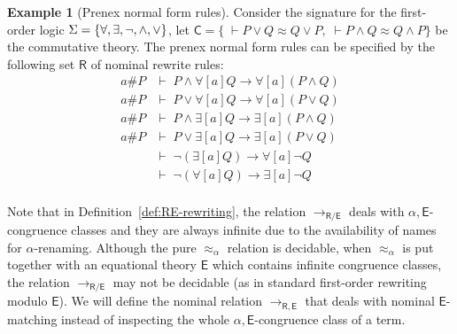 \documentclass[submission,copyright,creativecommons]{eptcs}
\newcommand{\aleq}{\approx_{\alpha}}
\newcommand{\theory}[1]{\ensuremath{\mathsf{#1}}}
\theoremstyle{plain}
\theoremstyle{definition}
\newtheorem{example}{Example}[section]
\theoremstyle{remark}
\newtheorem{remark}[theorem]{Remark}
\begin{document}
\begin{example}[Prenex normal form rules]\label{ex:prenex-rules}
    Consider the signature for the first-order logic $\Sigma = \{\forall, \exists, \lnot, \land,\linebreak
    \lor \}$, let $\theory{C} = \{\;\vdash P \lor Q \approx Q \lor P, \;\vdash P \land Q \approx Q \land P\}$ be the commutative theory. The prenex normal form rules can be specified by the following set $\theory{R}$ of nominal rewrite rules:
\[
\begin{array}{rl}
    a \# P & \vdash \; P \land \forall[a]Q \rightarrow \forall [a](P \land Q)\\
    a \# P & \vdash \; P \lor \forall[a] Q \rightarrow \forall[a] (P \lor Q)\\
    a \# P & \vdash \; P \land \exists[a]Q \rightarrow \exists[a](P \land Q)\\
    a \# P & \vdash \; P \lor \exists[a]Q \rightarrow \exists[a](P \lor Q)\\
    & \vdash \; \lnot (\exists[a]Q) \rightarrow \forall[a] \lnot Q\\
    & \vdash \; \lnot (\forall[a]Q) \rightarrow \exists[a] \lnot Q\\
\end{array}
\]

\end{example}

Note that in Definition~\ref{def:RE-rewriting}, the relation $\to_\theory{R/E}$ deals with $\alpha,\theory{E}$-congruence classes and they are always infinite due to the availability of names for $\alpha$-renaming. Although  the pure $\approx_\alpha$ relation is decidable,
when $\aleq$ is put together with an equational theory $\theory{E}$ which contains infinite congruence classes, the relation $\to_{\theory{R/E}}$ may not be decidable (as in standard first-order rewriting modulo $\theory{E}$).  We will define the nominal relation  $\to_{\theory{R,E}}$ that deals with nominal $\theory{E}$-matching instead of inspecting the whole $\alpha,\theory{E}$-congruence class of a term. 
\end{document}
